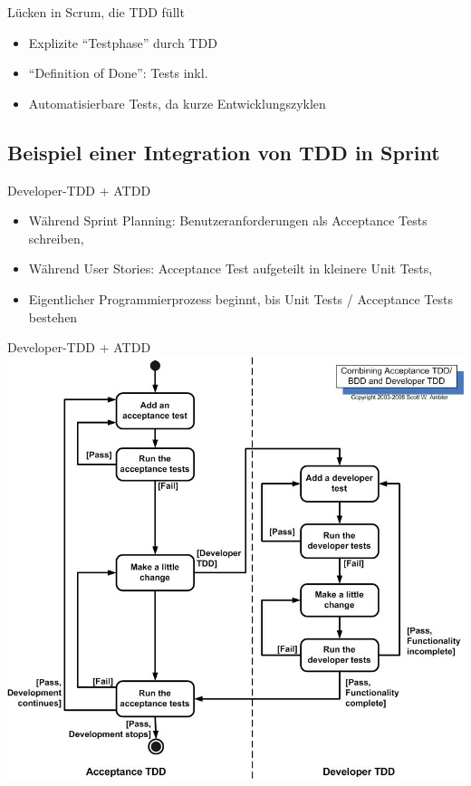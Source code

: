\documentclass{f4_beamer_metropolis}
\begin{document}
\begin{frame}{Lücken in Scrum, die TDD füllt}
\begin{itemize}
  \item Explizite \enquote{Testphase} durch TDD
  \item \enquote{Definition of Done}: Tests inkl.
  \item Automatisierbare Tests, da kurze Entwicklungszyklen
\end{itemize}
\end{frame}

\subsection{Beispiel einer Integration von TDD in Sprint}

\begin{frame}{Developer-TDD + ATDD}
  \begin{itemize}
    \item Während Sprint Planning: Benutzeranforderungen als Acceptance Tests schreiben,
    \item Während User Stories: Acceptance Test aufgeteilt in kleinere Unit Tests,
    \item Eigentlicher Programmierprozess beginnt, bis Unit Tests / Acceptance Tests bestehen
  \end{itemize}
\end{frame}

\begin{frame}{Developer-TDD + ATDD}
  \includegraphics[width=\textwidth,height=0.8\textheight,keepaspectratio]{./images/atdd.jpg}
  \nocite{astels_2003}
\end{frame}
\end{document}
